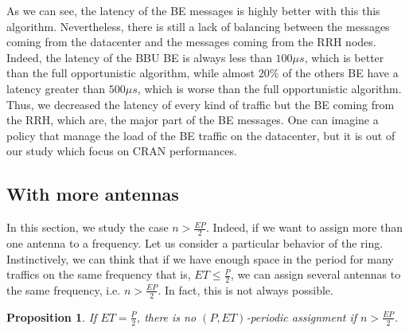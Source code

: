 \documentclass[a4paper,10pt,french,english]{article}
\newtheorem{prop}{Proposition}
\begin{document}
  As we can see, the latency of the BE messages is highly better with this this algorithm. Nevertheless, there is still a lack of balancing between the messages coming from the datacenter and the messages coming from the RRH nodes. Indeed, the latency of the BBU BE is always less than $100 \mu s$, which is better than the full opportunistic algorithm, while almost $20\%$ of the others BE have a latency greater than $500\mu s$, which is worse than the full opportunistic algorithm. Thus, we decreased the latency of every kind of traffic but the BE coming from the RRH, which are, the major part of the BE messages. One can imagine a policy that manage the load of the BE traffic on the datacenter, but it is out of our study which focus on CRAN performances.

\subsection{With more antennas}
 In this section, we study the case $n > \frac{EP}{2}$. Indeed, if we want to assign more than one antenna to a frequency. 
 Let us consider a particular behavior of the ring. Instinctively, we can think that if we have enough space in the period for many traffics on the same frequency that is, $ET \le \frac{P}{2}$, we can assign several antennas to the same frequency, i.e. $n > \frac{EP}{2}$. In fact, this is not always possible. 
 \begin{prop}
If $ET = \frac{P}{2}$, there is no $(P,ET)$-periodic assignment if $n > \frac{EP}{2}$.
 \end{prop}
\end{document}

